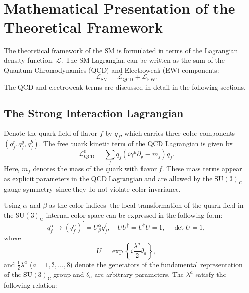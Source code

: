 \section{Mathematical Presentation of the Theoretical Framework}

The theoretical framework of the SM is formulated in terms of the Lagrangian density function, $\mathcal{L}$. 
The SM Lagrangian can be written as the sum of the Quantum Chromodynamics (QCD) and Electroweak (EW) components:
\begin{equation}
    \mathcal{L}_{\text{SM}} = \mathcal{L}_{\text{QCD}} + \mathcal{L}_{\text{EW}} .
\end{equation}
The QCD and electroweak terms are discussed in detail in the following sections.

\subsection{The Strong Interaction Lagrangian}

Denote the quark field of flavor $f$ by $q_f$, which carries three color components 
$(q_f^r, q_f^g, q_f^b)$. The free quark kinetic term of the QCD Lagrangian is given by~\cite{Pich2007SM}
\begin{equation}\label{eq:lag_qcd_1}
    \mathcal{L}_{\text{QCD}}^0 = \sum_{f} \bar{q}_{f}\left(i \gamma^{\mu} \partial_{\mu} - m_{f}\right) q_{f}.
\end{equation}
Here, $m_f$ denotes the mass of the quark with flavor $f$. 
These mass terms appear as explicit parameters in the QCD Lagrangian and are allowed by the $\mathrm{SU}(3)_{\text{C}}$ gauge symmetry, since they do not violate color invariance.

Using $\alpha$ and $\beta$ as the color indices, the local transformation of the quark field in the $\text{SU}(3)_{\text{C}}$ internal color space can be expressed in the following form:
\begin{equation}
    q_{f}^{\alpha} \longrightarrow\left(q_{f}^{\alpha}\right)^{\prime}=U_{\beta}^{\alpha} q_{f}^{\beta}, \quad U U^{\dagger}=U^{\dagger} U=1, \quad \operatorname{det} U=1,
\end{equation}
where
\begin{equation}
    U=\exp \left\{i \frac{\lambda^{a}}{2} \theta_{a}\right\},
\end{equation}
and $\frac{1}{2} \lambda^{a}$ ($a=1,2, \ldots, 8$) denote the generators of the fundamental representation of the $\text{SU}(3)_{\text{C}}$ group and $\theta_{a}$ are arbitrary parameters. The $\lambda^{a}$ satisfy the following relation:

